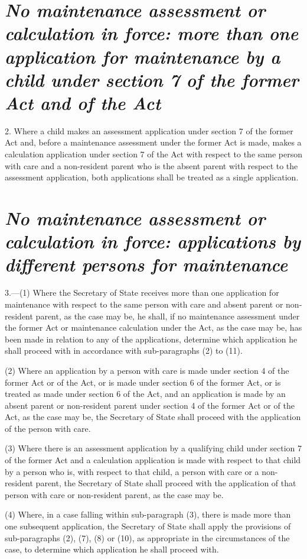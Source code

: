 \documentclass[12pt,a4paper]{article}
\begin{document}
\section*{\itshape No maintenance assessment or calculation in force: more than one application for maintenance by a child under section 7 of the former Act and of the Act}

2.  Where a child makes an assessment application under section 7 of the former Act and, before a maintenance assessment under the former Act is made, makes a calculation application under section 7 of the Act with respect to the same person with care and a non-resident parent who is the absent parent with respect to the assessment application, both applications shall be treated as a single application.

\section*{\itshape No maintenance assessment or calculation in force: applications by different persons for maintenance}

3.---(1)  Where the Secretary of State receives more than one application for maintenance with respect to the same person with care and absent parent or non-resident parent, as the case may be, he shall, if no maintenance assessment under the former Act or maintenance calculation under the Act, as the case may be, has been made in relation to any of the applications, determine which application he shall proceed with in accordance with sub-paragraphs (2) to (11).

(2) Where an application by a person with care is made under section 4 of the former Act or of the Act, or is made under section 6 of the former Act, or is treated as made under section 6 of the Act, and an application is made by an absent parent or non-resident parent under section 4 of the former Act or of the Act, as the case may be, the Secretary of State shall proceed with the application of the person with care.

(3) Where there is an assessment application by a qualifying child under section 7 of the former Act and a calculation application is made with respect to that child by a person who is, with respect to that child, a person with care or a non-resident parent, the Secretary of State shall proceed with the application of that person with care or non-resident parent, as the case may be.

(4) Where, in a case falling within sub-paragraph (3), there is made more than one subsequent application, the Secretary of State shall apply the provisions of sub-paragraphs (2), (7), (8) or (10), as appropriate in the circumstances of the case, to determine which application he shall proceed with.
\end{document}
